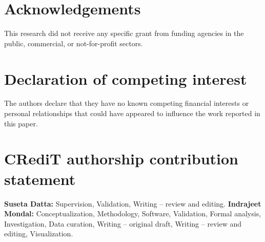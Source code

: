 
\section*{Acknowledgements}

This research did not receive any specific grant from funding agencies in the
public, commercial, or not-for-profit sectors.

\section*{Declaration of competing interest}

The authors declare that they have no known competing financial interests or
personal relationships that could have appeared to influence the work
reported in this paper.

\section*{CRediT authorship contribution statement}

\textbf{Suseta Datta:} Supervision, Validation, Writing -- review and
editing.
\textbf{Indrajeet Mondal:} Conceptualization, Methodology, Software,
Validation, Formal analysis, Investigation, Data curation, Writing --
original draft, Writing -- review and editing, Visualization.
